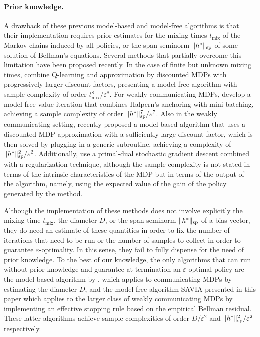 \documentclass{article}
\renewcommand{\sp}[1]{\|{#1}\|_\text{\rm sp}}
\theoremstyle{plain}
\theoremstyle{definition}
\theoremstyle{remark}
\begin{document}
\paragraph{Prior knowledge.}
A drawback of these previous model-based and model-free algorithms is that their implementation requires prior estimates for the
mixing times $t_{\text{mix}}$ of the Markov chains induced by all policies, 
or the span seminorm  $\sp{h^*}$ of some solution of Bellman's equations. 
Several methods  that partially overcome this limitation have been proposed recently. In the case of finite but unknown mixing times, \citet{jin2024feasible} combine Q-learning and approximation by discounted MDPs with progressively larger discount factors, presenting a model-free algorithm with sample complexity of order  $t_{\text{mix}}^8/\varepsilon^8$. 
For weakly communicating MDPs, \citet{bravostochastic} develop a model-free value iteration that combines Halpern's anchoring with mini-batching, achieving a sample complexity  of order $\sp{h^*}^7/\varepsilon^{7}$.
 Also in the weakly communicating setting,
 \citet{zurek2024plug} recently proposed a model-based algorithm that uses a discounted MDP approximation with a sufficiently large discount factor, which is then solved by plugging in a generic subroutine, achieving a complexity of
$\sp{h^*}^2/\varepsilon^2$.
Additionally,   \citet{neu2024dealing} use a primal-dual stochastic gradient descent combined with a regularization technique, although the sample complexity is not stated in terms of the intrinsic characteristics of the MDP but in terms of the output of the algorithm, namely, using the expected value of the gain of the policy generated by the method.


Although the implementation of these methods does not involve explicitly the mixing time $t_{\text{mix}}$, the diameter $D$, or the span seminorm $\sp{h^*}$ of a bias vector,
they do need an estimate of these quantities in order to fix the number of iterations that need to be run or the number of samples to collect in order to guarantee $\varepsilon$-optimality. In this sense, they fail to fully dispense for the need of prior knowledge.
To the best of our knowledge, the only algorithms that can run without prior knowledge and guarantee at termination an $\varepsilon$-optimal policy are the model-based algorithm by \citet{tuynman2024finding}, which applies to communicating MDPs by estimating the diameter $D$, and the model-free algorithm {SAVIA\text{+}} presented in this paper which applies to the larger class of weakly communicating MDPs by implementing an effective stopping rule based on the empirical Bellman residual.
These latter algorithms achieve sample complexities of order $D/\varepsilon^2$ and $\sp{h^*}^2/\varepsilon^2$  respectively.
\end{document}
